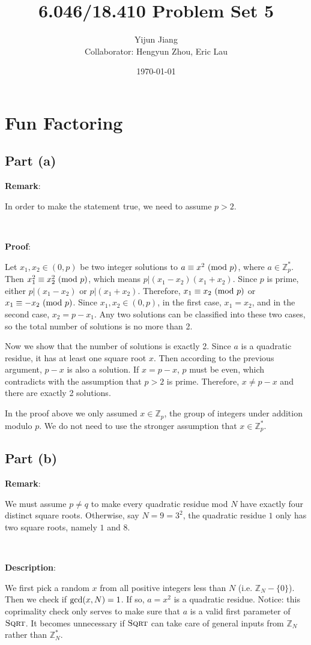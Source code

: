 \documentclass{article}
\title{6.046/18.410 Problem Set 5}
\author{Yijun Jiang\vspace{3pt}\\Collaborator: Hengyun Zhou, Eric Lau}
\date{\today}
\begin{document}
\maketitle
\section{Fun Factoring}
\subsection{Part (a)}
\noindent\textbf{Remark}:

In order to make the statement true, we need to assume $p>2$.

~

\noindent\textbf{Proof}:

Let $x_1,x_2\in(0,p)$ be two integer solutions to $a\equiv x^2\textup{ (mod }p)$, where $a\in\mathbb{Z}_p^*$. Then $x_1^2\equiv x_2^2\textup{ (mod }p)$, which means $p|(x_1-x_2)(x_1+x_2)$. Since $p$ is prime, either $p|(x_1-x_2)$ or $p|(x_1+x_2)$. Therefore, $x_1\equiv x_2\textup{ (mod }p)$ or $x_1\equiv-x_2\textup{ (mod }p)$. Since $x_1,x_2\in(0,p)$, in the first case, $x_1=x_2$, and in the second case, $x_2=p-x_1$. Any two solutions can be classified into these two cases, so the total number of solutions is no more than 2.

Now we show that the number of solutions is exactly 2. Since $a$ is a quadratic residue, it has at least one square root $x$. Then according to the previous argument, $p-x$ is also a solution. If $x=p-x$, $p$ must be even, which contradicts with the assumption that $p>2$ is prime. Therefore, $x\neq p-x$ and there are exactly 2 solutions.

In the proof above we only assumed $x\in\mathbb{Z}_p$, the group of integers under addition modulo $p$. We do not need to use the stronger assumption that $x\in\mathbb{Z}_p^*$.

\subsection{Part (b)}
\noindent\textbf{Remark}:

We must assume $p\neq q$ to make every quadratic residue mod $N$ have exactly four distinct square roots. Otherwise, say $N=9=3^2$, the quadratic residue $1$ only has two square roots, namely $1$ and $8$.

~

\noindent\textbf{Description}:

We first pick a random $x$ from all positive integers less than $N$ (i.e. $\mathbb{Z}_N-\{0\}$). Then we check if $\textup{gcd}(x,N)=1$. If so, $a=x^2$ is a quadratic residue. Notice: this coprimality check only serves to make sure that $a$ is a valid first parameter of $\textsc{Sqrt}$. It becomes unnecessary if $\textsc{Sqrt}$ can take care of general inputs from $\mathbb{Z}_N$ rather than $\mathbb{Z}_N^*$.
\end{document}
